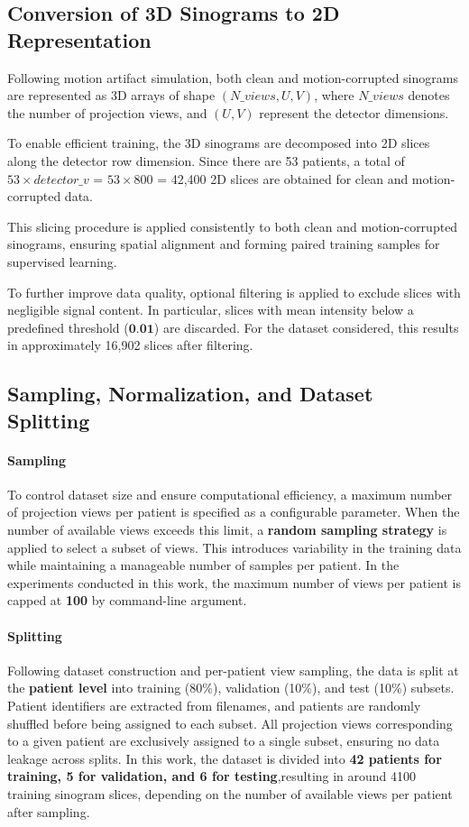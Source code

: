 \subsection{Conversion of 3D Sinograms to 2D Representation  }
Following motion artifact simulation, both clean and motion-corrupted sinograms are represented as 3D arrays of shape  $(N\_{views}, U, V)$, where $N\_{views}$  denotes the number of projection views, and $(U, V)$ represent the detector dimensions.

To enable efficient training, the 3D sinograms are decomposed into 2D slices along the detector row dimension.  Since there are 53 patients, a total of $53 \times  detector\_v$ = $53 \times 800$ = 42,400 2D slices are obtained for clean and motion-corrupted data. 

This slicing procedure is applied consistently to both clean and motion-corrupted sinograms, ensuring spatial alignment and forming paired training samples for supervised learning.

To further improve data quality, optional filtering is applied to exclude slices with negligible signal content. In particular, slices with mean intensity below a predefined threshold (\textbf{$\textbf{0.01}$}) are discarded. For the dataset considered, this results in approximately  16,902 slices after filtering.

\subsection{Sampling, Normalization, and Dataset Splitting}
\paragraph{Sampling}
To control dataset size and ensure computational efficiency, a maximum number of projection views per patient is specified as a configurable parameter.  When the number of available views exceeds this limit, a \textbf{random sampling strategy} is applied to select a subset of views. This introduces variability in the training data while maintaining a manageable number of samples per patient. In the experiments conducted in this work, the maximum number of views per patient is capped at \textbf{100} by command-line argument. 
\paragraph{Splitting}
Following dataset construction and per-patient view sampling, the data is split at the \textbf{patient level} into training (80\%), validation (10\%), and test (10\%) subsets. Patient identifiers are extracted from filenames, and patients are randomly shuffled before being assigned to each subset. All projection views corresponding to a given patient are exclusively assigned to a single subset, ensuring no data leakage across splits. In this work, the dataset is divided into \textbf{42 patients for training, 5 for validation, and 6 for testing},resulting in around 4100 training sinogram slices, depending on the number of available views per patient after sampling. 

